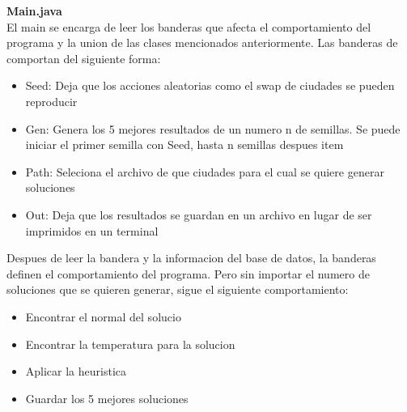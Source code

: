 \documentclass{article}
\begin{document}
    \textbf{Main.java} \\
    El main se encarga de leer los banderas que afecta el comportamiento del programa y la union de las clases
    mencionados anteriormente. Las banderas de comportan del siguiente forma:
    \begin{itemize}
        \item Seed: Deja que los acciones aleatorias como el swap de ciudades se pueden reproducir
        \item Gen: Genera los 5 mejores resultados de un numero n de semillas. Se puede iniciar el primer
        semilla con Seed, hasta n semillas despues
        item
        \item Path: Seleciona el archivo de que ciudades para el cual se quiere generar soluciones
        \item Out: Deja que los resultados se guardan en un archivo en lugar de ser imprimidos en un terminal
    \end{itemize}
    Despues de leer la bandera y la informacion del base de datos, la banderas definen el comportamiento del
    programa. Pero sin importar el numero de soluciones que se quieren generar, sigue el siguiente
    comportamiento:
    \begin{itemize}
        \item Encontrar el normal del solucio
        \item Encontrar la temperatura para la solucion
        \item Aplicar la heuristica
        \item Guardar los 5 mejores soluciones
    \end{itemize}
    
\end{document}
